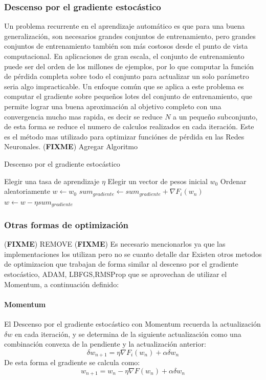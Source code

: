 \documentclass[a4paper,11pt,spanish]{book}
\newcommand*{\FIXME}[1]{{(\textbf{FIXME}) {#1}}}
\begin{document}
      \subsubsection{Descenso por el gradiente estocástico}
	Un problema recurrente en el aprendizaje automático es que para una buena generalización, son necesarios grandes conjuntos de entrenamiento,
	pero grandes conjuntos de entrenamiento también son más costosos desde el punto de vista computacional.
	En aplicaciones de gran escala, el conjunto de entrenamiento puede ser del orden de los millones de ejemplos, por lo que computar la función de
	pérdida completa sobre todo el conjunto para actualizar un solo parámetro seria algo impracticable.
	Un enfoque común que se aplica a este problema es computar el gradiente sobre pequeños lotes del conjunto de entrenamiento,
	que permite lograr una buena aproximación al objetivo completo con una convergencia mucho mas rapida, es decir se reduce $N$ a un pequeño subconjunto, de esta forma se reduce el
	numero de calculos realizados en cada iteración.
	Este es el método mas utilizado para optimizar funciónes de pérdida en las Redes Neuronales.
	\FIXME{Agregar Algoritmo}
	  \begin{algorithm}[h]
	    \caption{Descenso por el gradiente estocástico}
	    \label{SGD}
	    \begin{algorithmic}
	      \State Elegir una tasa de aprendizaje $\eta$
	      \State Elegir un vector de pesos inicial $w_0$
	      \State Ordenar aleatoriamente
	      \State $w \gets w_0$
	      \Repeat
		  $sum_{gradiente} \gets sum_{gradiente} + \nabla F_i(w_n)$
		\EndFor
		\State $w \gets w - \eta sum_{gradiente}$
	    \end{algorithmic}
	  \end{algorithm}


      \subsubsection{Otras formas de optimización}\FIXME{REMOVE}
	\FIXME{Es necesario mencionarlos ya que las implementaciones los utilizan pero no se cuanto detalle dar}
	Existen otros metodos de optimizacion que trabajan de forma similar al descenso por el gradiente estocástico, ADAM, LBFGS,RMSProp que se aprovechan de utilizar el Momentum, a continuación definido:
	\paragraph{Momentum} El Descenso por el gradiente estocástico con Momentum recuerda la actualización $\delta w$ en cada iteración, y se determina de la siguiente actualización
	como una combinación convexa de la pendiente y la actualización anterior:
	  \begin{equation}
	   \delta w_{n+1} = \eta \nabla F_i(w_n) + \alpha \delta w_n
	  \end{equation}
	  De esta forma el gradiente se calcula como:
	  \begin{equation}
	    w_{n+1} = w_n - \eta \nabla F(w_n)  + \alpha \delta w_n
	  \end{equation}
\end{document}
